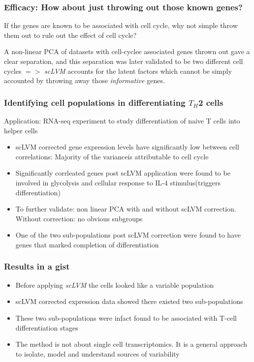 \documentclass[10pt, compress]{beamer}
\renewcommand{\(}{\begin{columns}}
\renewcommand{\)}{\end{columns}}
\newcommand{\<}[1]{\begin{column}{#1}}
\renewcommand{\>}{\end{column}}
\begin{document}
\begin{frame}
\frametitle{Efficacy: How about just throwing out those known genes?}
If the genes are known to be associated with cell cycle, why not simple throw them out to rule out the 
effect of cell cycle?

A non-linear PCA of datasets with cell-cyclee associated genes thrown out gave a clear separation, and this separation
was later validated to be two different cell cycles $=>$ \textit{scLVM} accounts for the latent factors which
cannot be simply accounted by throwing away those \textit{informative} genes.

\end{frame}

\begin{frame}
\frametitle{Identifying cell populations in differentiating $T_H$2 cells}
Application: RNA-seq experiment to study differentiation of naive T cells into helper cells
\begin{itemize}[<+- | alert@+>]
\item scLVM corrected gene expression levels have significantly low between cell correlations: Majority of the varianceis attributable to cell cycle
\item Significantly corrleated genes post scLVM application were found to be involved in glycolysis and cellular response to IL-4 stimulus(triggers differentiation)
\item To further validate: non linear PCA with and without scLVM correction. Without correction: no obvious subgroups
\item One of the two sub-populations post scLVM correction were found to have genes that marked completion of differentiation

\end{itemize}
\end{frame}

\begin{frame}
\frametitle{Results in a gist}
\begin{itemize}[<+- | alert@+>]
\item Before applying \textit{scLVM} the cells looked like a variable population
\item scLVM corrected expression data showed there existed two sub-populations
\item These two sub-populations were infact found to be associated with T-cell differentiation stages
\item The method is not about single cell transcriptomics. It is a general approach to isolate, model and understand sources of variability
\end{itemize}
\end{frame}
\end{document}
